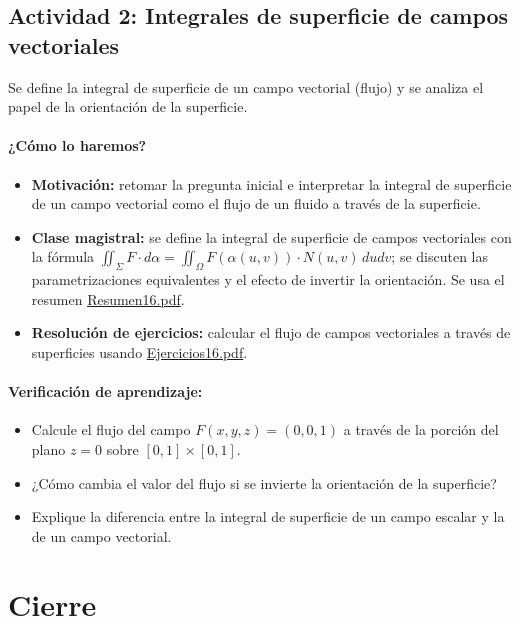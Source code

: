 \documentclass[a4,11pt]{aleph-notas}
\begin{document}
\subsection*{Actividad 2: Integrales de superficie de campos vectoriales}
Se define la integral de superficie de un campo vectorial (flujo) y se analiza el papel de la orientación de la superficie.

\paragraph{¿Cómo lo haremos?}
\begin{itemize}[leftmargin=*]
    \item \textbf{Motivación:} retomar la pregunta inicial e interpretar la integral de superficie de un campo vectorial como el flujo de un fluido a través de la superficie.
    \item \textbf{Clase magistral:} se define la integral de superficie de campos vectoriales con la fórmula $\iint_\Sigma F\cdot d\alpha=\iint_\Omega F(\alpha(u,v))\cdot N(u,v)\,dudv$; se discuten las parametrizaciones equivalentes y el efecto de invertir la orientación. Se usa el resumen \href{https://andres-merino.github.io/MatematicaIII-05-N0051/01Resumen/Resumen16.pdf}{Resumen16.pdf}.
    \item \textbf{Resolución de ejercicios:} calcular el flujo de campos vectoriales a través de superficies usando \href{https://andres-merino.github.io/MatematicaIII-05-N0051/04Ejercicios/Ejercicios16.pdf}{Ejercicios16.pdf}.
\end{itemize}

\paragraph{Verificación de aprendizaje:}
\begin{itemize}[leftmargin=*]
    \item Calcule el flujo del campo $F(x,y,z)=(0,0,1)$ a través de la porción del plano $z=0$ sobre $[0,1]\times[0,1]$.
    \item ¿Cómo cambia el valor del flujo si se invierte la orientación de la superficie?
    \item Explique la diferencia entre la integral de superficie de un campo escalar y la de un campo vectorial.
\end{itemize}

\section*{Cierre}
\end{document}
